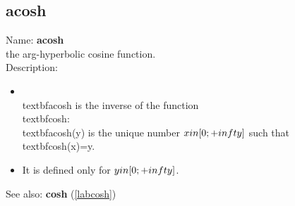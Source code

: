 \subsection{acosh}
\label{labacosh}
\noindent Name: \textbf{acosh}\\
the arg-hyperbolic cosine function.\\
\noindent Description: \begin{itemize}

\item \\textbf{acosh} is the inverse of the function \\textbf{cosh}: \\textbf{acosh}(y) is the unique number \n   $x \\in [0; +\\infty]$ such that \\textbf{cosh}(x)=y.\n
\item It is defined only for $y \\in [0;+\\infty]$.\n\end{itemize}
See also: \textbf{cosh} (\ref{labcosh})
